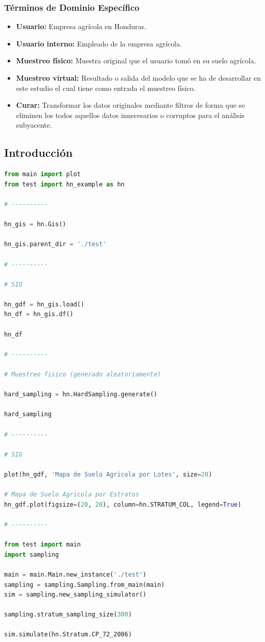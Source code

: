 \documentclass[conference]{IEEEtran}
\begin{document}
\subsubsection{Términos de Dominio Específico}

\begin{itemize}
    \item \textbf{Usuario:} Empresa agrícola en Honduras.

    \item \textbf{Usuario interno:} Empleado de la empresa agrícola.

    \item \textbf{Muestreo físico:} Muestra original que el usuario tomó en su suelo agrícola.

    \item \textbf{Muestreo virtual:} Resultado o salida del modelo que se ha de desarrollar en este estudio el cual tiene como entrada el muestreo físico.

    \item \textbf{Curar:} Transformar los datos originales mediante filtros de forma que se eliminen los todos aquellos datos innecesarios o corruptos para el análisis subyacente.
\end{itemize}


\subsection{Introducción}

\begin{lstlisting}[language=Python, caption=Introducción al enunciados del problema]
from main import plot
from test import hn_example as hn

# ----------

hn_gis = hn.Gis()

hn_gis.parent_dir = './test'

# ----------

# SIG

hn_gdf = hn_gis.load()
hn_df = hn_gis.df()

hn_df

# ----------

# Muestreo fisico (generado aleatoriamente)

hard_sampling = hn.HardSampling.generate()

hard_sampling

# ----------

# SIG

plot(hn_gdf, 'Mapa de Suelo Agricola por Lotes', size=20)

# Mapa de Suelo Agricola por Estratos
hn_gdf.plot(figsize=(20, 20), column=hn.STRATUM_COL, legend=True)

# ----------

from test import main
import sampling

main = main.Main.new_instance('./test')
sampling = sampling.Sampling.from_main(main)
sim = sampling.new_sampling_simulator()

sampling.stratum_sampling_size(300)

sim.simulate(hn.Stratum.CP_72_2086)
\end{lstlisting}
\end{document}
